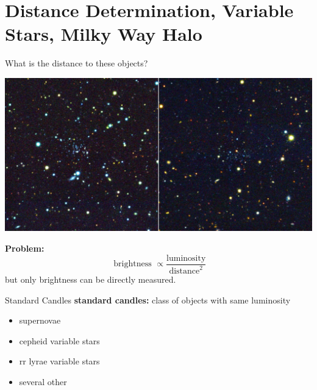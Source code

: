 \documentclass[12pt]{beamer}
\begin{document}
\frame{\tableofcontents}






\section{Distance Determination, Variable Stars, Milky Way Halo}

\begin{frame}{What is the distance to these objects?}

  \begin{center}
    \includegraphics[scale=0.2]{figs/des_image.jpg}\\
  \end{center}
  \textbf{Problem:}
  \begin{equation*}
    \text{ brightness } \propto \frac{\text{luminosity}}{\text{distance}^2}
  \end{equation*}
  but only brightness can be directly measured.
  \end{frame}

\begin{frame}{Standard Candles}
  \textbf{standard candles:} class of objects with same luminosity
  \begin{itemize}
  \item supernovae
  \item cepheid variable stars
  \item rr lyrae variable stars
  \item several other
  \end{itemize}
\end{frame}
\end{document}
